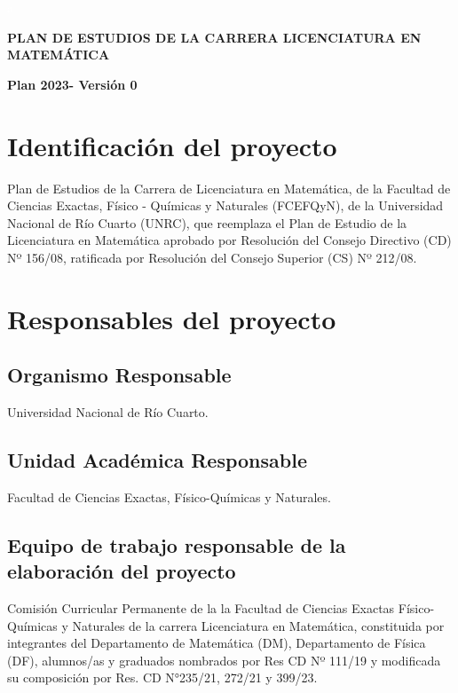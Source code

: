 \documentclass[a4paper, 12pt]{article}
\begin{document}
 
 
 \textcolor{white}{a}   
 \vspace{3cm}
 
\begin{center}
 \textbf{PLAN DE ESTUDIOS DE LA CARRERA LICENCIATURA EN MATEMÁTICA}
 
\textbf{Plan 2023- Versión 0}
\end{center}


 
 \newpage



\tableofcontents

\newpage


\section{Identificación del proyecto}  

Plan de Estudios de la 
Carrera de Licenciatura en Matemática, de la Facultad de Ciencias Exactas, 
Físico - Químicas y Naturales (FCEFQyN), de la Universidad Nacional de Río Cuarto (UNRC), que  reemplaza el Plan de Estudio de la Licenciatura en Matemática aprobado por Resolución del Consejo Directivo (CD) Nº 156/08, 
ratificada por Resolución del Consejo Superior (CS) Nº 212/08.


\section{Responsables del proyecto}

\subsection{ Organismo Responsable} 

Universidad Nacional de Río Cuarto.

\subsection{Unidad Académica Responsable} 

Facultad de Ciencias Exactas, Físico-Químicas y Naturales.



\subsection{Equipo de trabajo responsable de la elaboración del proyecto}

Comisión Curricular Permanente de la 
la Facultad de Ciencias Exactas Físico-Químicas y Naturales de la carrera Licenciatura en Matemática, constituida por integrantes del Departamento de Matemática (DM), Departamento de Física (DF), alumnos/as y graduados nombrados por Res CD Nº  111/19 y modificada su composición por Res. CD N°235/21, 272/21 y 399/23.  
\end{document}
